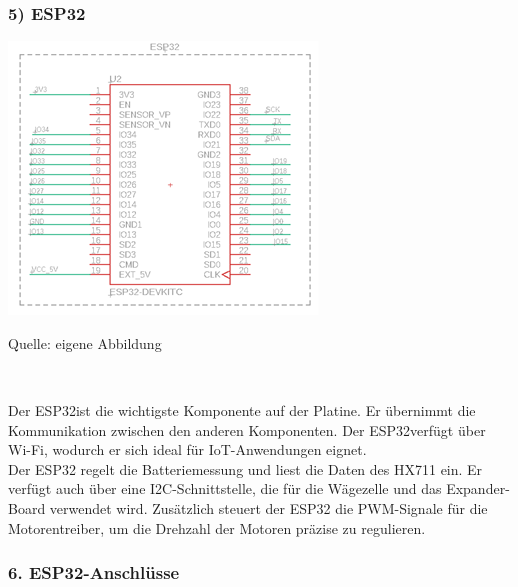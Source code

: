 \documentclass[ngerman,12pt,a4paper]{article}
\begin{document}
		\subsubsection*{5) ESP32}
		
		\begin{center} 
			\begin{minipage}[t]{0.5\textwidth}
				\includegraphics{Pictures/Schaltplan-ESP32}
				\label{fig: Schaltplan ESP32}
				\vspace{-10pt}
				\begin{center}
					\par\small Quelle: eigene Abbildung
				\end{center}
			\end{minipage} \\[0.75cm]
		\end{center}
		Der ESP32ist die wichtigste Komponente auf der Platine. Er übernimmt die Kommunikation zwischen den anderen Komponenten. Der ESP32verfügt über Wi-Fi, wodurch er sich ideal für IoT-Anwendungen eignet.\\[0.5cm]
		Der ESP32 regelt die Batteriemessung und liest die Daten des HX711 ein. Er verfügt auch über eine I2C-Schnittstelle, die für die Wägezelle und das Expander-Board verwendet wird. Zusätzlich steuert der ESP32 die PWM-Signale für die Motorentreiber, um die Drehzahl der Motoren präzise zu regulieren.
		
		\subsubsection*{6. ESP32-Anschlüsse}
		
\end{document}
